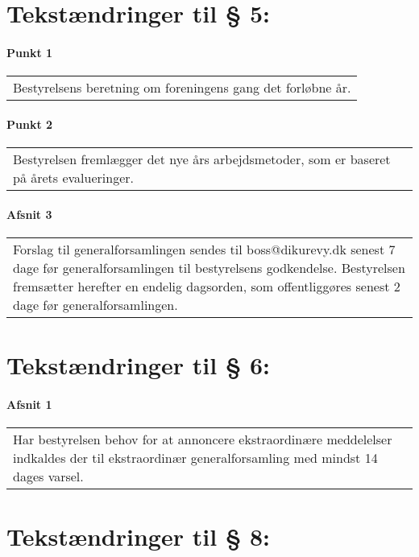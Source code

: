 \documentclass[a4paper,11pt]{report}
\newenvironment{quotationb}%
{\begin{tabular}{|p{10cm}}}%
{\\\end{tabular}}
\begin{document}
\begin{appendices}
\section*{Tekstændringer til § 5:}

\paragraph{Punkt 1}

\begin{quotationb}
Bestyrelsens beretning om foreningens gang det forløbne år.
\end{quotationb}

\paragraph{Punkt 2}

\begin{quotationb}
Bestyrelsen fremlægger det nye års arbejdsmetoder, som er baseret på årets
evalueringer.
\end{quotationb}

\paragraph{Afsnit 3}

\begin{quotationb}
Forslag til generalforsamlingen sendes til boss@dikurevy.dk senest 7 dage før
generalforsamlingen til bestyrelsens godkendelse.  Bestyrelsen fremsætter
herefter en endelig dagsorden, som offentliggøres senest 2 dage før
generalforsamlingen.
\end{quotationb}

\section*{Tekstændringer til § 6:}

\paragraph{Afsnit 1}

\begin{quotationb}
Har bestyrelsen behov for at annoncere ekstraordinære meddelelser indkaldes
der til ekstraordinær generalforsamling med mindst 14 dages varsel.
\end{quotationb}

\section*{Tekstændringer til § 8:}


\end{appendices}
\end{document}
